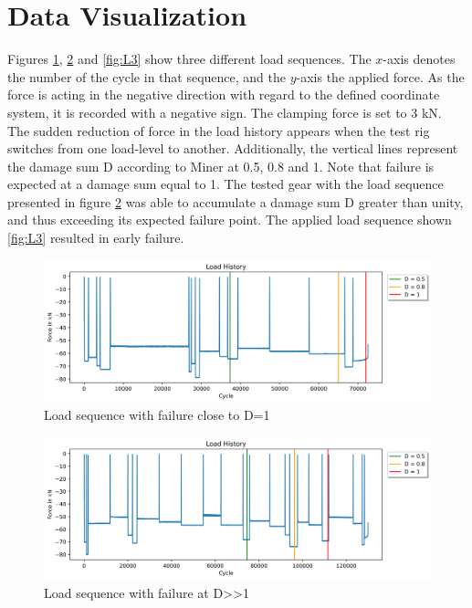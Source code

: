\section{Data Visualization}\label{DV}
Figures \ref{fig:L1}, \ref{fig:L2} and \ref{fig:L3} show three different load sequences. The \(x\)-axis denotes the number of the cycle in that sequence, and the \(y\)-axis the applied force. As the force is acting in the negative direction with regard to the defined coordinate system, it is recorded with a negative sign. The clamping force is set to 3 kN. The sudden reduction of force in the load history appears when the test rig switches from one load-level to another. 
Additionally, the vertical lines represent the damage sum D according to Miner at 0.5, 0.8 and 1. Note that failure is expected at a damage sum equal to 1. The tested gear with the load sequence presented in figure \ref{fig:L2} was able to accumulate a damage sum D greater than unity, and thus exceeding its expected failure point. The applied load sequence shown \ref{fig:L3} resulted in early failure.

\begin{figure}[H]
	\centering
	\includegraphics[width=1\linewidth]{IMGs/Load/L0.jpg}
	\caption{Load sequence with failure close to D=1}
	\label{fig:L1}
\end{figure}

\begin{figure}[H]
	\centering
	\includegraphics[width=1\linewidth]{IMGs/Load/L1.jpg}
	\caption{Load sequence with failure at D>>1}
	\label{fig:L2}
\end{figure}

